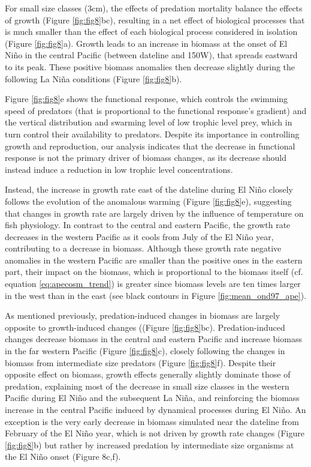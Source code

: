 For small size classes (3cm), the effects of predation mortality balance the effects of growth (Figure \ref{fig:fig8}bc), resulting in a net effect of biological processes that is much smaller than the effect of each biological process considered in isolation (Figure \ref{fig:fig8}a). Growth leads to an increase in biomass at the onset of El Niño in the central Pacific (between dateline and 150\degree{}W), that spreads eastward to its peak. These positive biomass anomalies then decrease slightly during the following La Niña conditions (Figure \ref{fig:fig8}b).

Figure \ref{fig:fig8}e shows the functional response, which controls the swimming speed of predators (that is proportional to the functional response's gradient) and the vertical distribution and swarming level of low trophic level prey, which in turn control their availability to predators.  Despite its importance in controlling growth and reproduction, our analysis indicates that the decrease in functional response is not the primary driver of biomass changes, as its decrease should instead induce a reduction in low trophic level concentrations.

Instead, the increase in growth rate east of the dateline during El Niño closely follows the evolution of the anomalous warming (Figure \ref{fig:fig8}e), suggesting that changes in growth rate are largely driven by the influence of temperature on fish physiology. In contrast to the central and eastern Pacific, the growth rate decreases in the western Pacific as it cools from July of the El Niño year, contributing to a decrease in biomass. Although these growth rate negative anomalies in the western Pacific are smaller than the positive ones in the eastern part, their impact on the biomass, which is proportional to the biomass itself (cf. equation \ref{eq:apecosm_trend}) is greater since biomass levels are ten times larger in the west than in the east (see black contours in Figure \ref{fig:mean_ond97_ape}).

As mentioned previously, predation-induced changes in biomass are largely opposite to growth-induced changes  ((Figure \ref{fig:fig8}bc). Predation-induced changes decrease biomass in the central and eastern Pacific and increase biomass in the far western Pacific (Figure \ref{fig:fig8}c), closely following the changes in biomass from intermediate size predators (Figure \ref{fig:fig8}f). Despite their opposite effect on biomass, growth effects generally slightly dominate those of predation, explaining most of the decrease in small size classes in the western Pacific during El Niño and the subsequent La Niña, and reinforcing the biomass increase in the central Pacific induced by dynamical processes during El Niño. An exception is the very early decrease in biomass simulated near the dateline from February of the El Niño year, which is not driven by growth rate changes (Figure \ref{fig:fig8}b) but rather by increased predation by intermediate size organisms at the El Niño onset (Figure 8c,f).


